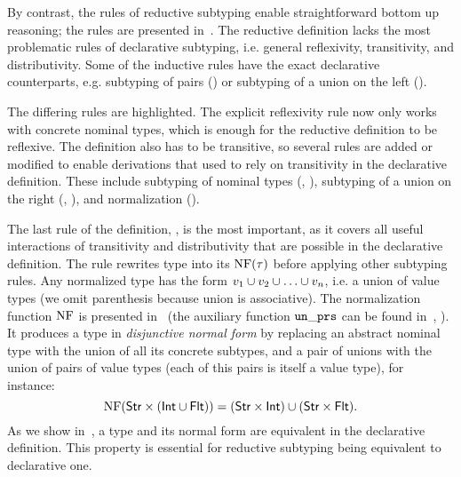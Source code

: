 By contrast, the rules of reductive subtyping enable
straightforward bottom up reasoning;
the rules are presented in~.
The reductive definition lacks the most problematic rules
of declarative subtyping, 
i.e. general reflexivity, transitivity, and distributivity.
Some of the inductive rules have the exact declarative counterparts,
e.g. subtyping of pairs () or
subtyping of a union on the left ().

The differing rules are \colorbox{light-gray}{highlighted}.
The explicit reflexivity rule  now only works with 
concrete nominal types, which is enough 
for the reductive definition to be reflexive.
The definition also has to be transitive,
so several rules are added or modified to enable derivations
that used to rely on transitivity in the declarative definition.
These include subtyping of nominal types (, ),
subtyping of a union on the right (, ),
and normalization ().

The last rule of the definition, , is the most important,
as it covers all useful interactions of transitivity and distributivity 
that are possible in the declarative definition.
The rule rewrites type \ty into its  $\mathop{\mathrm{NF}}(\tau)$
before applying other subtyping rules.
Any normalized type has the form $v_1 \cup v_2 \cup \ldots \cup v_n$,
i.e. a union of value types
(we omit parenthesis because union is associative).
The normalization function $\mathop{\mathrm{NF}}$ is presented in~
(the auxiliary function $\mathop{\mathtt{un\_prs}}$ 
can be found in~, ).
It produces a type in \emph{disjunctive normal form}
by replacing an abstract nominal type 
with the union of all its concrete subtypes, 
and a pair of unions with the union of pairs of value types
(each of this pairs is itself a value type),
for instance:
\[
\mathop{\mathrm{NF}}(\mathsf{Str} \times (\mathsf{Int} \cup \mathsf{Flt})) =
(\mathsf{Str} \times \mathsf{Int}) \cup (\mathsf{Str} \times \mathsf{Flt}).
\]
As we show in~, a type and its normal form are
equivalent in the declarative definition.
This property is essential for reductive subtyping 
being equivalent to declarative one.


